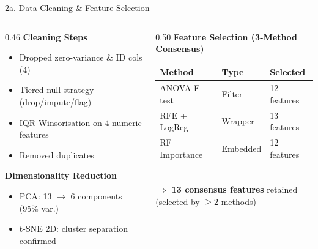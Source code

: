 \documentclass[aspectratio=169, 10pt]{beamer}
\begin{document}
\begin{frame}{2a. Data Cleaning \& Feature Selection}
\small
\begin{columns}[T]
\begin{column}{0.46\textwidth}
  \textbf{\color{teal}Cleaning Steps}
  \begin{itemize}\setlength\itemsep{1pt}\footnotesize
    \item Dropped zero-variance \& ID cols (4)
    \item Tiered null strategy (drop/impute/flag)
    \item IQR Winsorisation on 4 numeric features
    \item Removed duplicates
  \end{itemize}

  \vspace{4pt}
  \textbf{\color{teal}Dimensionality Reduction}
  \begin{itemize}\setlength\itemsep{1pt}\footnotesize
    \item PCA: 13 $\rightarrow$ 6 components (95\% var.)
    \item t-SNE 2D: cluster separation confirmed
  \end{itemize}
\end{column}
\begin{column}{0.50\textwidth}
  \textbf{\color{amber}Feature Selection (3-Method Consensus)}\\[4pt]
  \footnotesize
  \begin{tabular}{@{}l l l@{}}
    \toprule
    \textbf{Method} & \textbf{Type} & \textbf{Selected} \\
    \midrule
    ANOVA F-test       & Filter   & 12 features \\
    RFE + LogReg       & Wrapper  & 13 features \\
    RF Importance       & Embedded & 12 features \\
    \bottomrule
  \end{tabular}\\[6pt]
  \small $\Rightarrow$ \textbf{13 consensus features} retained\\
  (selected by $\geq$2 methods)
\end{column}
\end{columns}
\end{frame}
\end{document}
